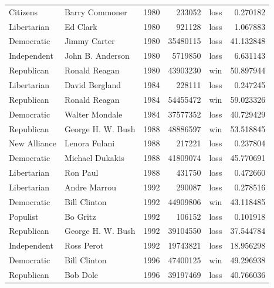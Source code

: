 \documentclass[
  letterpaper,
  DIV=11,
  numbers=noendperiod]{scrreprt}
\begin{document}
\begin{tabular}{llrrlr}
Citizens              &          Barry Commoner &  1980 &        233052 &   loss &   0.270182 \\
Libertarian           &                Ed Clark &  1980 &        921128 &   loss &   1.067883 \\
Democratic            &            Jimmy Carter &  1980 &      35480115 &   loss &  41.132848 \\
Independent           &        John B. Anderson &  1980 &       5719850 &   loss &   6.631143 \\
Republican            &           Ronald Reagan &  1980 &      43903230 &    win &  50.897944 \\
Libertarian           &          David Bergland &  1984 &        228111 &   loss &   0.247245 \\
Republican            &           Ronald Reagan &  1984 &      54455472 &    win &  59.023326 \\
Democratic            &          Walter Mondale &  1984 &      37577352 &   loss &  40.729429 \\
Republican            &       George H. W. Bush &  1988 &      48886597 &    win &  53.518845 \\
New Alliance          &           Lenora Fulani &  1988 &        217221 &   loss &   0.237804 \\
Democratic            &         Michael Dukakis &  1988 &      41809074 &   loss &  45.770691 \\
Libertarian           &                Ron Paul &  1988 &        431750 &   loss &   0.472660 \\
Libertarian           &            Andre Marrou &  1992 &        290087 &   loss &   0.278516 \\
Democratic            &            Bill Clinton &  1992 &      44909806 &    win &  43.118485 \\
Populist              &                Bo Gritz &  1992 &        106152 &   loss &   0.101918 \\
Republican            &       George H. W. Bush &  1992 &      39104550 &   loss &  37.544784 \\
Independent           &              Ross Perot &  1992 &      19743821 &   loss &  18.956298 \\
Democratic            &            Bill Clinton &  1996 &      47400125 &    win &  49.296938 \\
Republican            &                Bob Dole &  1996 &      39197469 &   loss &  40.766036 \\

\end{tabular}
\end{document}
